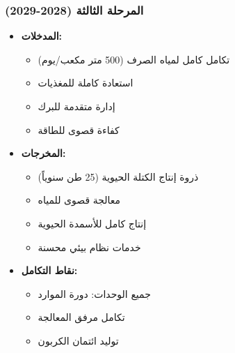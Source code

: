 \subsubsection{المرحلة الثالثة (2028-2029)}
\begin{itemize}
    \item \textbf{المدخلات:}
    \begin{itemize}
        \item تكامل كامل لمياه الصرف (500 متر مكعب/يوم)
        \item استعادة كاملة للمغذيات
        \item إدارة متقدمة للبرك
        \item كفاءة قصوى للطاقة
    \end{itemize}
    \item \textbf{المخرجات:}
    \begin{itemize}
        \item ذروة إنتاج الكتلة الحيوية (25 طن سنوياً)
        \item معالجة قصوى للمياه
        \item إنتاج كامل للأسمدة الحيوية
        \item خدمات نظام بيئي محسنة
    \end{itemize}
    \item \textbf{نقاط التكامل:}
    \begin{itemize}
        \item جميع الوحدات: دورة الموارد
        \item تكامل مرفق المعالجة
        \item توليد ائتمان الكربون
    \end{itemize}
\end{itemize}

